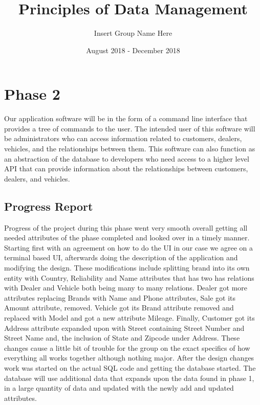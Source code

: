 \documentclass{math}
\title{Principles of Data Management}
\author{Insert Group Name Here}
\date{August 2018 - December 2018}
\begin{document}
\lstset{basicstyle=\ttfamily\footnotesize,breaklines=true}
\maketitle

\section*{Phase 2}
Our application software will be in the form of a command line interface that
provides a tree of commands to the user. The intended user of this software will
be administrators who can access information related to customers, dealers,
vehicles, and the relationships between them. This software can also function
as an abstraction of the database to developers who need access to a higher
level API that can provide information about the relationships between
customers, dealers, and vehicles.

\subsection*{Progress Report}
Progress of the project during this phase went very smooth overall getting
all needed attributes of the phase completed and looked over in a timely
manner. Starting first with an agreement on how to do the UI in our case
we agree on a terminal based UI, afterwards doing the description of the
application and modifying the design. These modifications include splitting
brand into its own entity with Country, Reliability and Name attributes that
has two has relations with Dealer and Vehicle both being many to many
relations.  Dealer got more attributes replacing Brands with Name and Phone
attributes, Sale got its Amount attribute, removed.  Vehicle got its Brand
attribute removed and replaced with Model and got a new attribute Mileage.
Finally, Customer got its Address attribute expanded upon with Street
containing Street Number and Street Name and, the inclusion of State and
Zipcode under Address. These changes cause a little bit of trouble for the
group on the exact specifics of how everything all works together although
nothing major. After the design changes work was started on the actual SQL code
and getting the database started. The database will use additional data that
expands upon the data found in phase 1, in a large quantity of data and
updated with the newly add and updated attributes.
\end{document}
